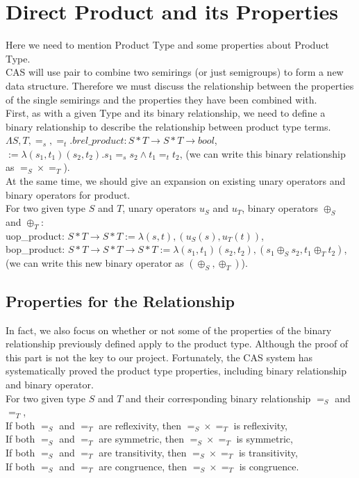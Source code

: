 \documentclass[a4paper,12pt,twoside,openright]{report}
\begin{document}
\section{Direct Product and its Properties}
Here we need to mention Product Type and some properties about Product Type. \\
CAS will use pair to combine two semirings (or just semigroups) to form a new data structure. 
Therefore we must discuss the relationship between the properties of the single semirings and the properties they have been combined with. \\
First, as with a given Type and its binary relationship, we need to define a binary relationship to describe the relationship between product type terms.\\
$\Lambda S, T, =_s, =_t. brel\_product : S * T \rightarrow S * T \rightarrow bool$, \\
$:= \lambda (s_1,t_1) (s_2, t_2). s_1 =_s s_2 \wedge t_1 =_t t_2$, (we can write this binary relationship as $=_S \times =_T$).\\
At the same time, we should give an expansion on existing unary operators and binary operators for product.\\
For two given type $S$ and $T$, unary operators $u_S$ and $u_T$, binary operators $\oplus_S$ and $\oplus_T$:\\
uop\_product: $S*T \rightarrow S*T := \lambda (s,t), (u_S (s),u_T(t))$,\\
bop\_product: $S*T \rightarrow S*T \rightarrow S*T := \lambda (s_1,t_1)(s_2,t_2), (s_1 \oplus_S s_2,t_1 \oplus_T t_2)$, (we can write this new binary operator as $(\oplus_S,\oplus_T)$).
\subsection{Properties for the Relationship}
In fact, we also focus on whether or not some of the properties of the binary relationship previously defined apply to the product type. Although the proof of this part is not the key to our project. 
Fortunately, the CAS system has systematically proved the product type properties, including binary relationship and binary operator. \\
For two given type $S$ and $T$ and their corresponding binary relationship $=_S$ and $=_T$,\\
If both $=_S$ and $=_T$ are reflexivity, then $=_S \times =_T$ is reflexivity,\\
If both $=_S$ and $=_T$ are symmetric, then $=_S \times =_T$ is symmetric,\\
If both $=_S$ and $=_T$ are transitivity, then $=_S \times =_T$ is transitivity,\\
If both $=_S$ and $=_T$ are congruence, then $=_S \times =_T$ is congruence.
\end{document}

